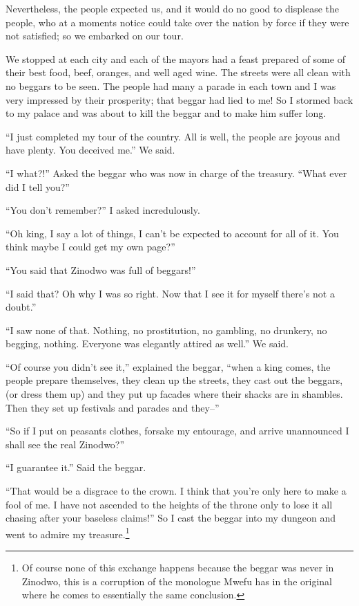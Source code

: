 Nevertheless, the people expected us, and it would do no good to displease the people, who at a moments notice could take over the nation by force if they were not satisfied; so we embarked on our tour. 

We stopped at each city and each of the mayors had a feast prepared of some of their best food, beef, oranges, and well aged wine. The streets were all clean with no beggars to be seen. The people had many a parade in each town and I was very impressed by their prosperity; that beggar had lied to me! So I stormed back to my palace and was about to kill the beggar and to make him suffer long.

``I just completed my tour of the country. All is well, the people are joyous and have plenty. You deceived me.'' We said.

``I what?!'' Asked the beggar who was now in charge of the treasury. ``What ever did I tell you?''

``You don't remember?'' I asked incredulously.

``Oh king, I say a lot of things, I can't be expected to account for all of it. You think maybe I could get my own page?''

``You said that Zi\-no\-dwo was full of beggars!''

``I said that? Oh why I was so right. Now that I see it for myself there's not a doubt.''

``I saw none of that. Nothing, no prostitution, no gambling, no drunkery, no begging, nothing. Everyone was elegantly attired as well.'' We said.

``Of course you didn't see it,'' explained the beggar, ``when a king comes, the people prepare themselves, they clean up the streets, they cast out the beggars, (or dress them up) and they put up facades where their shacks are in shambles. Then they set up festivals and parades and they--''

``So if I put on peasants clothes, forsake my entourage, and arrive unannounced I shall see the real Zi\-no\-dwo?''

``I guarantee it.'' Said the beggar.

``That would be a disgrace to the crown. I think that you're only here to make a fool of me. I have not ascended to the heights of the throne only to lose it all chasing after your baseless claims!'' So I cast the beggar into my dungeon and went to admire my treasure.\footnote{Of course none of this exchange happens because the beggar was never in Zi\-no\-dwo, this is a corruption of the monologue Mwe\-fu has in the original where he comes to essentially the same conclusion.}

